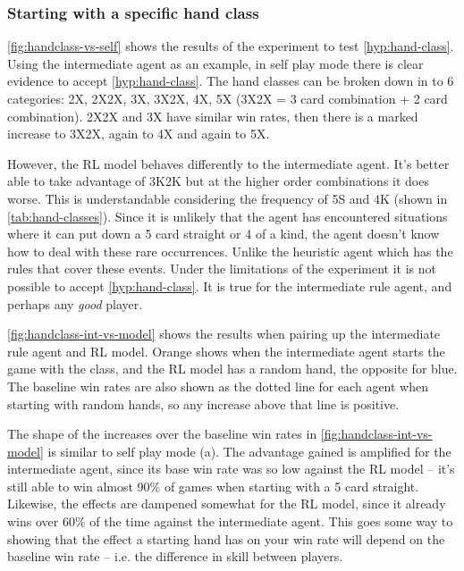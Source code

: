 \documentclass[../main.tex]{subfiles}
\begin{document}
\subsubsection{Starting with a specific hand class}

\cref{fig:handclass-vs-self} shows the results of the experiment to test \cref{hyp:hand-class}. Using the intermediate agent as an example, in self play mode there is clear evidence to accept \cref{hyp:hand-class}. The hand classes can be broken down in to 6 categories: 2X, 2X2X, 3X, 3X2X, 4X, 5X (3X2X = 3 card combination + 2 card combination). 2X2X and 3X have similar win rates, then there is a marked increase to 3X2X, again to 4X and again to 5X. 

However, the RL model behaves  differently to the intermediate agent. It's better able to take advantage of 3K2K but at the higher order combinations it does worse. This is understandable considering the frequency of 5S and 4K (shown in \cref{tab:hand-classes}). Since it is unlikely that the agent has encountered situations where it can put down a 5 card straight or 4 of a kind, the agent doesn't know how to deal with these rare occurrences. Unlike the heuristic agent which has the rules that cover these events. Under the limitations of the experiment it is not possible to accept \cref{hyp:hand-class}. It is true for the intermediate rule agent, and perhaps any \textit{good} player. 


\cref{fig:handclass-int-vs-model} shows the results when pairing up the intermediate rule agent and RL model. Orange shows when the intermediate agent starts the game with the class, and the RL model has a random hand, the opposite for blue. The baseline win rates are also shown as the dotted line for each agent when starting with random hands, so any increase above that line is positive. 

The shape of the increases over the baseline win rates in \cref{fig:handclass-int-vs-model} is similar to self play mode (a). The advantage gained is amplified for the intermediate agent, since its base win rate was so low against the RL model -- it's still able to win almost 90\% of games when starting with a 5 card straight. Likewise, the effects are dampened somewhat for the RL model, since it already wins over 60\% of the time against the intermediate agent. This goes some way to showing that the effect a starting hand has on your win rate will depend on the baseline win rate -- i.e. the difference in skill between players. 
\end{document}
